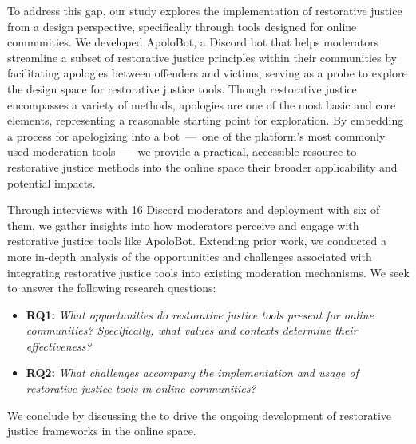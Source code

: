 To address this gap, our study explores the implementation of restorative justice from a design perspective, specifically through tools designed for online communities. We developed ApoloBot, a Discord bot that helps moderators streamline a subset of restorative justice principles within their communities by facilitating apologies between offenders and victims, serving as a probe to explore the design space for restorative justice tools. Though restorative justice encompasses a variety of methods, apologies are one of the most basic and core elements, representing a reasonable starting point for exploration. By embedding a process for apologizing into a bot~---~one of the platform's most commonly used moderation tools~---~we provide a practical, accessible resource to  restorative justice methods into the online space their broader applicability and potential impacts. 

Through interviews with 16 Discord moderators and deployment with six of them, we gather insights into how moderators perceive and engage with restorative justice tools like ApoloBot. Extending prior work, we conducted a more in-depth analysis of the opportunities and challenges associated with integrating restorative justice tools into existing moderation mechanisms. We seek to answer the following research questions:
\begin{itemize}
    \item \textbf{RQ1:} \textit{What opportunities do restorative justice tools present for online communities? Specifically, what values and contexts determine their effectiveness?}
    \item \textbf{RQ2:} \textit{What challenges accompany the implementation and usage of restorative justice tools in online communities?}
\end{itemize} 

We conclude by discussing the %
to drive the ongoing development of restorative justice frameworks in the online space. 